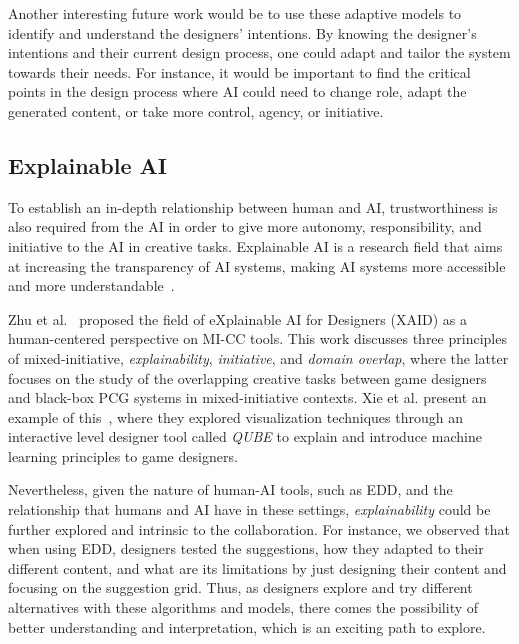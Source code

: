 Another interesting future work would be to use these adaptive models to identify and understand the designers' intentions. By knowing the designer's intentions and their current design process, one could adapt and tailor the system towards their needs. For instance, it would be important to find the critical points in the design process where AI could need to change role, adapt the generated content, or take more control, agency, or initiative.


\subsection{Explainable AI}

To establish an in-depth relationship between human and AI, trustworthiness is also required from the AI in order to give more autonomy, responsibility, and initiative to the AI in creative tasks. Explainable AI is a research field that aims at increasing the transparency of AI systems, making AI systems more accessible and more understandable~\cite{adadi_peeking_2018,doshi-velez_considerations_2018}.

Zhu et al.~\cite{zhu_explainable_2018} proposed the field of eXplainable AI for Designers (XAID) as a human-centered perspective on MI-CC tools. This work discusses three principles of mixed-initiative, \emph{explainability}, \emph{initiative}, and \emph{domain overlap}, where the latter focuses on the study of the overlapping creative tasks between game designers and black-box PCG systems in mixed-initiative contexts. Xie et al. present an example of this~\cite{xie_interactive_2019}, where they explored visualization techniques through an interactive level designer tool called \textit{QUBE} to explain and introduce machine learning principles to game designers.

Nevertheless, given the nature of human-AI tools, such as EDD, and the relationship that humans and AI have in these settings, \emph{explainability} could be further explored and intrinsic to the collaboration. For instance, we observed that when using EDD, designers tested the suggestions, how they adapted to their different content, and what are its limitations by just designing their content and focusing on the suggestion grid. Thus, as designers explore and try different alternatives with these algorithms and models, there comes the possibility of better understanding and interpretation, which is an exciting path to explore. 

